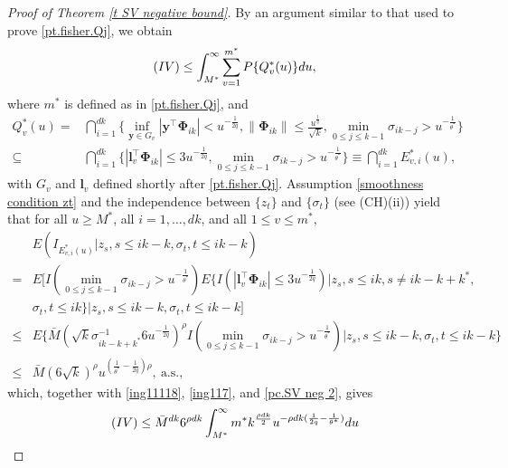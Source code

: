\documentclass[ejsv2]{imsart}
\theoremstyle{plain}
\theoremstyle{definition}
\theoremstyle{remark}
\begin{document}
\begin{appendix}
\begin{proof}[Proof of Theorem \ref{t SV negative bound}]
By an argument similar to that used to prove \eqref{pt.fisher.Qj}, we obtain
\begin{eqnarray}
\label{ing117}
{\rm (IV)} \leq \int_{M^\ast}^{\infty}\sum_{v=1}^{m^\ast}P\{Q_v^{\ast}(u)\} du,
\end{eqnarray}
where $m^{\ast}$ is defined as in
\eqref{pt.fisher.Qj}, and
\begin{equation}\label{pc.SV neg 2}
\begin{split}
    Q_v^\ast(u)= &\bigcap_{i=1}^{dk}\{\inf\limits_{\bm{y}\in G_v}|\bm{y}^\top\bm{\Phi}_{ik}|<u^{-\frac{1}{2q}},\lVert\bm{\Phi}_{ik}\rVert\leq\frac{u^{\frac{l}{q}}}{\sqrt{k}},{\min\limits_{0\leq j\leq k-1}\sigma_{ik-j}}>u^{-\frac{1}{\theta^\ast}}\}  \\
    \subseteq & \bigcap_{i=1}^{dk}\{|\bm{l}_v^\top\bm{\Phi}_{ik}|\leq3u^{-\frac{1}{2q}},{\min\limits_{0\leq j\leq k-1}\sigma_{ik-j}}>u^{-\frac{1}{\theta^\ast}}\}\equiv\bigcap_{i=1}^{dk}E^\ast_{v,i}(u),
\end{split}
\end{equation}
with $G_v$ and $\bm{l}_v$ defined shortly after  \eqref{pt.fisher.Qj}. 
Assumption \eqref{smoothness condition zt} and the
independence between $\{z_t\}$ and $\{\sigma_t\}$
(see (CH)(ii)) yield that for
all $u\geq M^\ast$, %
all $i=1,\ldots,dk$, and all $1\leq v \leq m^{\ast}$,
\begin{equation*}
\begin{split}
    & E(I_{E^\ast_{v,i}(u)}|z_s,s\leq ik-k,\sigma_t,t\leq ik-k)\\
    =& E[I(\min\limits_{0\leq j\leq k-1}\sigma_{ik-j}>u^{-\frac{1}{\theta^\ast}})E\{I(|\bm{l}_v^\top\bm{\Phi}_{ik}|\leq3u^{-\frac{1}{2q}})|z_s,s\leq ik,s\neq ik-k+k^\ast,\\
    &\sigma_t,t\leq ik\}|z_s,s\leq ik-k,\sigma_t,t\leq ik-k]\\
    \leq& E\{\bar{M}(\sqrt{k}\sigma^{-1}_{ik-k+k^\ast}6u^{-\frac{1}{2q}})^\rho I({\min\limits_{0\leq j\leq k-1}\sigma_{ik-j}}>u^{-\frac{1}{\theta^\ast}})|z_s,s\leq ik-k,\sigma_t,t\leq ik-k\}\\
    \leq& \bar{M}(6\sqrt{k})^\rho u^{(\frac{1}{\theta^\ast}-\frac{1}{2q})\rho},\ \textrm{a.s.},
\end{split}
\end{equation*}
which, together with \eqref{ing11118}, \eqref{ing117}, and \eqref{pc.SV neg 2}, gives
\begin{equation*}%
  {\rm (IV)}\leq \bar{M}^{dk}6^{\rho dk} \int_{M^{\ast}}^{\infty} m^{\ast} {k^{\frac{\rho dk}{2}}}u^{-\rho d k (\frac{1}{2q}-\frac{1}{\theta^\ast})} du

\end{equation*}
\end{proof}
\end{appendix}
\end{document}
